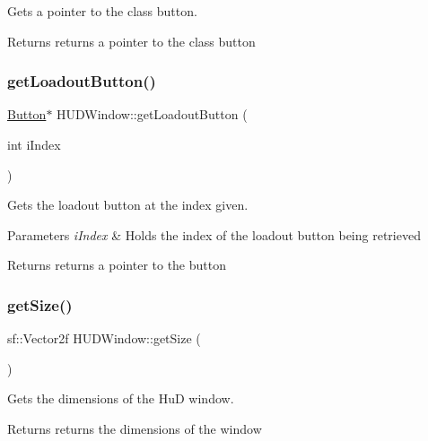 Gets a pointer to the class button. 

\begin{DoxyReturn}{Returns}
returns a pointer to the class button 
\end{DoxyReturn}
\mbox{\label{class_h_u_d_window_a06b79b305114538e82ea074378472d7a}} 
\subsubsection{\texorpdfstring{get\+Loadout\+Button()}{getLoadoutButton()}}
{\footnotesize\ttfamily \hyperlink{class_button}{Button}$\ast$ H\+U\+D\+Window\+::get\+Loadout\+Button (\begin{DoxyParamCaption}\item[{int}]{i\+Index }\end{DoxyParamCaption})}



Gets the loadout button at the index given. 


\begin{DoxyParams}{Parameters}
{\em i\+Index} & Holds the index of the loadout button being retrieved \\
\hline
\end{DoxyParams}
\begin{DoxyReturn}{Returns}
returns a pointer to the button 
\end{DoxyReturn}
\mbox{\label{class_h_u_d_window_a42beb8845c07df07ef5ef459b5d12bd0}} 
\subsubsection{\texorpdfstring{get\+Size()}{getSize()}}
{\footnotesize\ttfamily sf\+::\+Vector2f H\+U\+D\+Window\+::get\+Size (\begin{DoxyParamCaption}{ }\end{DoxyParamCaption})}



Gets the dimensions of the HuD window. 

\begin{DoxyReturn}{Returns}
returns the dimensions of the window 
\end{DoxyReturn}
\mbox{\label{class_h_u_d_window_af521ea9fc7357f71c0e1dbc9c23d64f7}} 
